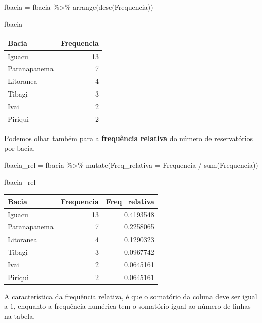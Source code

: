 \documentclass[
]{book}
\newenvironment{Shaded}{\begin{snugshade}}{\end{snugshade}}
\newcommand{\AttributeTok}[1]{\textcolor[rgb]{0.77,0.63,0.00}{#1}}
\newcommand{\FunctionTok}[1]{\textcolor[rgb]{0.00,0.00,0.00}{#1}}
\newcommand{\NormalTok}[1]{#1}
\newcommand{\OtherTok}[1]{\textcolor[rgb]{0.56,0.35,0.01}{#1}}
\newcommand{\SpecialCharTok}[1]{\textcolor[rgb]{0.00,0.00,0.00}{#1}}
\begin{document}
\begin{Shaded}
\begin{Highlighting}[]
\NormalTok{fbacia }\OtherTok{=}\NormalTok{ fbacia }\SpecialCharTok{\%\textgreater{}\%} 
  \FunctionTok{arrange}\NormalTok{(}\FunctionTok{desc}\NormalTok{(Frequencia))}

\NormalTok{fbacia}
\end{Highlighting}
\end{Shaded}

\begin{tabular}{l|r}
\hline
Bacia & Frequencia\\
\hline
Iguacu & 13\\
\hline
Paranapanema & 7\\
\hline
Litoranea & 4\\
\hline
Tibagi & 3\\
\hline
Ivai & 2\\
\hline
Piriqui & 2\\
\hline
\end{tabular}

Podemos olhar também para a \textbf{frequência relativa} do número de reservatórios por bacia.

\begin{Shaded}
\begin{Highlighting}[]
\NormalTok{fbacia\_rel }\OtherTok{=}\NormalTok{ fbacia }\SpecialCharTok{\%\textgreater{}\%} 
  \FunctionTok{mutate}\NormalTok{(}\AttributeTok{Freq\_relativa =}\NormalTok{ Frequencia }\SpecialCharTok{/} \FunctionTok{sum}\NormalTok{(Frequencia))}

\NormalTok{fbacia\_rel}
\end{Highlighting}
\end{Shaded}

\begin{tabular}{l|r|r}
\hline
Bacia & Frequencia & Freq\_relativa\\
\hline
Iguacu & 13 & 0.4193548\\
\hline
Paranapanema & 7 & 0.2258065\\
\hline
Litoranea & 4 & 0.1290323\\
\hline
Tibagi & 3 & 0.0967742\\
\hline
Ivai & 2 & 0.0645161\\
\hline
Piriqui & 2 & 0.0645161\\
\hline
\end{tabular}

A característica da frequência relativa, é que o somatório da coluna deve ser igual a \(1\), enquanto a frequência numérica tem o somatório igual ao número de linhas na tabela.
\end{document}
